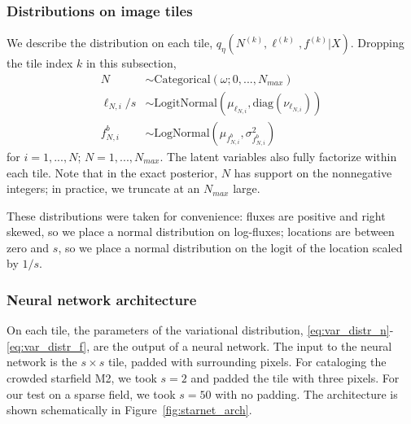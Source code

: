 \subsubsection{Distributions on image tiles}
We describe the distribution on each tile, $q_\eta(N^{(k)}, \ell^{(k)}, f^{(k)} | X)$. 
Dropping the tile index $k$ in this subsection,
\begin{align}
    N &\sim \text{Categorical}(\omega; 0, ..., N_{max}) \label{eq:var_distr_n}\\
	\ell_{N, i} / s &\sim \text{LogitNormal}(\mu_{\ell_{N, i}}, \text{diag}(\nu_{\ell_{N, i}}) )\label{eq:var_distr_loc}\\
	f^b_{N, i} &\sim \text{LogNormal}(\mu_{f^b_{N, i}}, \sigma^2_{f^b_{N, i}}) \label{eq:var_distr_f}
\end{align}
for $i = 1, ..., N$; $N = 1, ..., N_{max}$. The latent variables also fully factorize within each tile. Note that in the exact posterior, $N$ has support on the nonnegative integers; in practice, we truncate at an $N_{max}$ large.


These distributions were taken for convenience: fluxes are positive and right skewed, so we place a normal distribution on log-fluxes; locations are between zero and $s$, so 
we place a normal distribution on the logit of the location scaled by $1 / s$. 

\subsubsection{Neural network architecture}
On each tile, the parameters of the variational distribution, \eqref{eq:var_distr_n}-\eqref{eq:var_distr_f}, are the output of a neural network.
The input to the neural network is the $s \times s$ tile, padded with surrounding pixels.
For cataloging the crowded starfield M2,
we took $s = 2$ and padded the tile with three pixels. 
For our test on a sparse field, we took $s = 50$ with no padding. 
The architecture is shown schematically in Figure~\ref{fig:starnet_arch}. 

